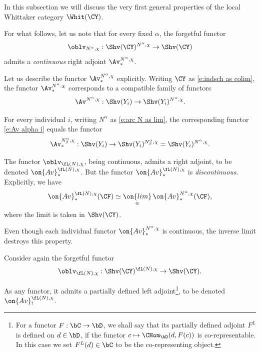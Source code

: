 \documentclass[9pt]{amsart}
\theoremstyle{definition}
\theoremstyle{remark}
\numberwithin{equation}{section}
\begin{document}

In this subsection we will discuss the very first general properties of the local Whittaker category
$\Whit(\CY)$. 

\sssec{}  \label{sss:Av alpha}

For what follows, let us note that for every fixed $\alpha$, the forgetful functor 
$$\oblv_{N^\alpha,\chi}:\Shv(\CY)^{N^\alpha,\chi}\to \Shv(\CY)$$
admits a \emph{continuous} right adjoint $\Av^{N^\alpha,\chi}_*$. 

\medskip

Let us describe the functor $\Av^{N^\alpha,\chi}_*$ explicitly.
Writing $\CY$ as \eqref{e:indsch as colim}, the functor $\Av^{N^\alpha,\chi}_*$ corresponds to a compatible
family of functors
\begin{equation} \label{e:Av alpha i}
\Av^{N^\alpha,\chi}:\Shv(Y_i)\to \Shv(Y_i)^{N^\alpha,\chi}.
\end{equation}

For every individual $i$, writing $N^\alpha$ as \eqref{e:arc N as lim}, the corresponding functor \eqref{e:Av alpha i}
equals the functor 
\begin{equation} \label{e:Av alpha beta i}
\Av^{N^\alpha_\beta,\chi}_*:\Shv(Y_i)\to \Shv(Y_i)^{N^\alpha_\beta,\chi}=\Shv(Y_i)^{N^\alpha,\chi}.
\end{equation}

\sssec{} \label{sss:*-av}

The functor $\oblv_{\fL(N),\chi}$, being continuous, admits a right adjoint, to be denoted 
$\on{Av}^{\fL(N),\chi}_*$. But the functor $\on{Av}^{\fL(N),\chi}_*$ is \emph{discontinuous}. Explicitly, we have
$$\on{Av}^{\fL(N),\chi}_*(\CF) \simeq \underset{\alpha}{\on{lim}}\, \on{Av}^{N^\alpha,\chi}_*(\CF),$$
where the limit is taken in $\Shv(\CY)$. 

\medskip

Even though each individual functor $\on{Av}^{N^\alpha,\chi}_*$ is continuous, the inverse limit destroys
this property. 

\sssec{} \label{sss:!-av}

Consider again the forgetful functor
$$\oblv_{\fL(N),\chi}:\Shv(\CY)^{\fL(N),\chi}\to \Shv(\CY).$$

As any functor, it admits a partially defined left adjoint\footnote{For a functor $F:\bC\to \bD$, we shall say that
its partially defined adjoint $F^L$ is defined on $d\in \bD$, if the functor $c\mapsto \CHom_\bD(d,F(c))$ is co-representable.
In this case we set $F^L(d)\in \bC$ to be the co-representing object.}, to be denoted 
$\on{Av}^{\fL(N),\chi}_!$.
\end{document}

